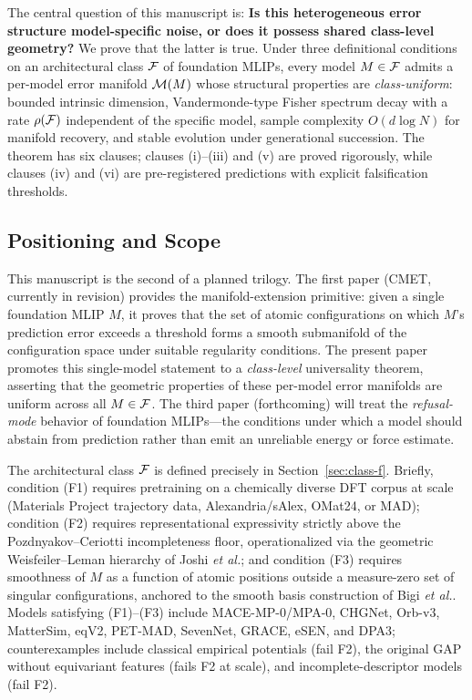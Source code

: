The central question of this manuscript is: \textbf{Is this heterogeneous error structure model-specific noise, or does it possess shared class-level geometry?} We prove that the latter is true. Under three definitional conditions on an architectural class $\mathcal{F}$ of foundation MLIPs, every model $M \in \mathcal{F}$ admits a per-model error manifold $\mathcal{M}(M)$ whose structural properties are \emph{class-uniform}: bounded intrinsic dimension, Vandermonde-type Fisher spectrum decay with a rate $\rho(\mathcal{F})$ independent of the specific model, sample complexity $O(d \log N)$ for manifold recovery, and stable evolution under generational succession. The theorem has six clauses; clauses (i)--(iii) and (v) are proved rigorously, while clauses (iv) and (vi) are pre-registered predictions with explicit falsification thresholds.

\subsection{Positioning and Scope}

This manuscript is the second of a planned trilogy. The first paper (CMET, currently in revision) provides the manifold-extension primitive: given a single foundation MLIP $M$, it proves that the set of atomic configurations on which $M$'s prediction error exceeds a threshold forms a smooth submanifold of the configuration space under suitable regularity conditions. The present paper promotes this single-model statement to a \emph{class-level} universality theorem, asserting that the geometric properties of these per-model error manifolds are uniform across all $M \in \mathcal{F}$. The third paper (forthcoming) will treat the \emph{refusal-mode} behavior of foundation MLIPs---the conditions under which a model should abstain from prediction rather than emit an unreliable energy or force estimate.

The architectural class $\mathcal{F}$ is defined precisely in Section~\ref{sec:class-f}. Briefly, condition (F1) requires pretraining on a chemically diverse DFT corpus at scale (Materials Project trajectory data, Alexandria/sAlex, OMat24, or MAD); condition (F2) requires representational expressivity strictly above the Pozdnyakov--Ceriotti incompleteness floor\cite{pozdnyakov2020incompleteness}, operationalized via the geometric Weisfeiler--Leman hierarchy of Joshi \emph{et al.}\cite{joshi2023expressive}; and condition (F3) requires smoothness of $M$ as a function of atomic positions outside a measure-zero set of singular configurations, anchored to the smooth basis construction of Bigi \emph{et al.}\cite{bigi2022smooth}. Models satisfying (F1)--(F3) include MACE-MP-0/MPA-0, CHGNet, Orb-v3, MatterSim, eqV2, PET-MAD, SevenNet, GRACE, eSEN, and DPA3; counterexamples include classical empirical potentials (fail F2), the original GAP without equivariant features (fails F2 at scale), and incomplete-descriptor models (fail F2).

